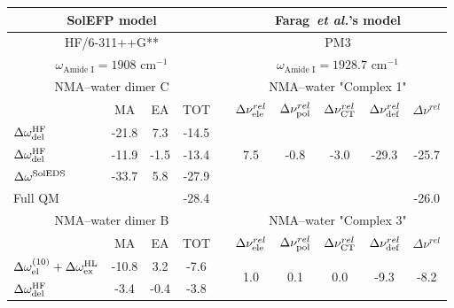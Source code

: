 \documentclass[a4paper,titlepage,twoside,fleqn,12pt]{book}
\begin{document}
\begin{refsection}
\begin{table}[t!]
{\label{t:farag}}
\begin{tabular*}{1.0\textwidth}{@{\extracolsep{\fill} } lccccccccc}
\hline\hline
\multicolumn{4}{c}{SolEFP model}       && \multicolumn{5}{c}{Farag~\emph{et al.}'s model} \\
\hline
\multicolumn{4}{c}{HF/6-311++G**}      && \multicolumn{5}{c}{PM3} \\
   \multicolumn{4}{c}{$\omega_{\text{Amide I}}=1908\text{ cm}^{-1}$}      
&& \multicolumn{5}{c}{$\omega_{\text{Amide I}}=1928.7\text{ cm}^{-1}$} \\
%
\hline
%
\multicolumn{4}{c}{NMA--water dimer C} && \multicolumn{5}{c}{NMA--water "Complex 1"} \\
\cline{1-4} \cline{6-10}
 & MA & EA & TOT && $\Delta\nu_{\rm ele}^{rel}$ & $\Delta\nu_{\rm pol}^{rel}$ & $\Delta\nu_{\rm CT}^{rel}$ & $\Delta\nu_{\rm def}^{rel}$ &
                       $\Delta\nu^{rel}$ \\
\cline{2-4} \cline{6-10}
 $\Delta\omega^{\rm HF}_{\rm del}$  
          & -21.8 &  7.3  & -14.5 && \multirow{3}{*}{  7.5} &
                                     \multirow{3}{*}{ -0.8} &
                                     \multirow{3}{*}{ -3.0} &
                                     \multirow{3}{*}{-29.3} &
                                     \multirow{3}{*}{-25.7} \\ 
 $\Delta\omega^{\rm HF}_{\rm del}$    
          & -11.9 & -1.5  & -13.4 && & & & &       \\
 $\Delta\omega^{\rm SolEDS}$    
          & -33.7 &  5.8  & -27.9 && & & & &       \\
 Full QM  &      &        & -28.4 && & & & & -26.0 \\
%
\hline
%
\multicolumn{4}{c}{NMA--water dimer B} && \multicolumn{5}{c}{NMA--water "Complex 3"} \\
\cline{1-4} \cline{6-10}
 & MA & EA & TOT && $\Delta\nu_{\rm ele}^{rel}$ & $\Delta\nu_{\rm pol}^{rel}$ & $\Delta\nu_{\rm CT}^{rel}$ & $\Delta\nu_{\rm def}^{rel}$ &
                       $\Delta\nu^{rel}$ \\
\cline{2-4} \cline{6-10}
 $\Delta\omega^{(10)}_{\rm el}+\Delta\omega^{\rm HL}_{\rm ex}$ 
          & -10.8 &  3.2  &  -7.6 && \multirow{3}{*}{  1.0} &
                                     \multirow{3}{*}{  0.1} &
                                     \multirow{3}{*}{  0.0} &
                                     \multirow{3}{*}{ -9.3} &
                                     \multirow{3}{*}{ -8.2} \\ 
 $\Delta\omega^{\rm HF}_{\rm del}$    
          &  -3.4 & -0.4  &  -3.8 && & & & &       \\

\end{tabular*}
\end{table}
\end{refsection}
\end{document}
